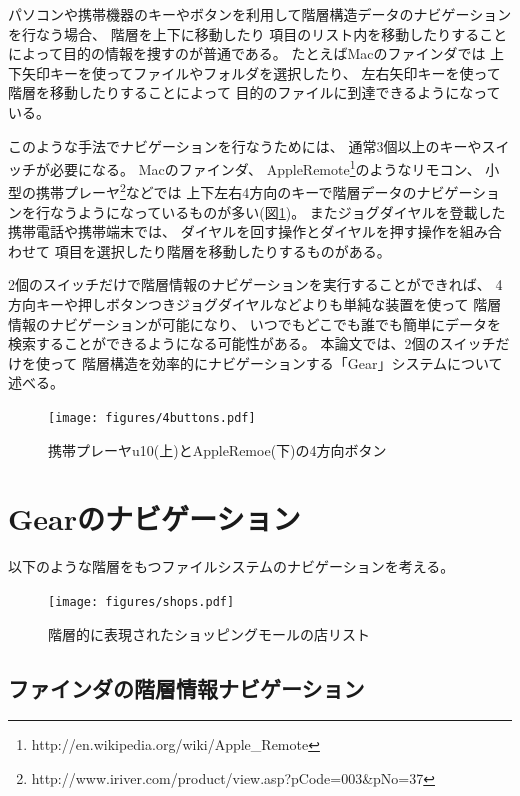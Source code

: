 \documentclass[twoside]{wiss}
\def\GEAR{\textsf{Gear}}
\begin{document}
パソコンや携帯機器のキーやボタンを利用して階層構造データのナビゲーションを行なう場合、
階層を上下に移動したり
項目のリスト内を移動したりすることによって目的の情報を捜すのが普通である。
たとえばMacのファインダでは
上下矢印キーを使ってファイルやフォルダを選択したり、
左右矢印キーを使って階層を移動したりすることによって
目的のファイルに到達できるようになっている。

このような手法でナビゲーションを行なうためには、
通常3個以上のキーやスイッチが必要になる。
%
Macのファインダ、
AppleRemote\footnote{
  \textsf{http://en.wikipedia.org/wiki/Apple\_Remote}
}のようなリモコン、
小型の携帯プレーヤ\footnote{
  \textsf{http://www.iriver.com/product/view.asp?pCode=003\&pNo=37}
}などでは
上下左右4方向のキーで階層データのナビゲーションを行なうようになっているものが多い(図\ref{4buttons})。
またジョグダイヤルを登載した携帯電話や携帯端末では、
ダイヤルを回す操作とダイヤルを押す操作を組み合わせて
項目を選択したり階層を移動したりするものがある。

2個のスイッチだけで階層情報のナビゲーションを実行することができれば、
4方向キーや押しボタンつきジョグダイヤルなどよりも単純な装置を使って
階層情報のナビゲーションが可能になり、
いつでもどこでも誰でも簡単にデータを検索することができるようになる可能性がある。
%
本論文では、2個のスイッチだけを使って
階層構造を効率的にナビゲーションする「{\GEAR}」システムについて述べる。

\begin{figure}[H]
\centerline{\texttt{[image: figures/4buttons.pdf]}}
\caption{携帯プレーヤu10(上)とAppleRemoe(下)の4方向ボタン}
\label{4buttons}
\end{figure}

\section{{\GEAR}のナビゲーション}
\label{description}

以下のような階層をもつファイルシステムのナビゲーションを考える。

\begin{figure}[H]
\centerline{\texttt{[image: figures/shops.pdf]}}
\caption{階層的に表現されたショッピングモールの店リスト}
\label{screenshot1}
\end{figure}

\subsection{ファインダの階層情報ナビゲーション}
\end{document}
